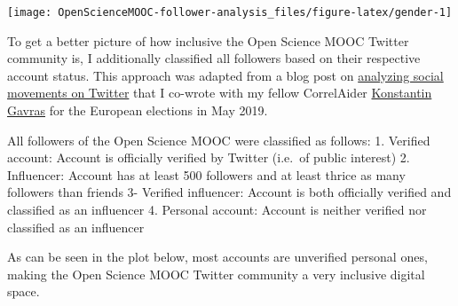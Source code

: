 \documentclass[]{article}
\begin{document}
\begin{center}\texttt{[image: OpenScienceMOOC-follower-analysis\_files/figure-latex/gender-1]} \end{center}

To get a better picture of how inclusive the Open Science MOOC Twitter
community is, I additionally classified all followers based on their
respective account status. This approach was adapted from a blog post on
\href{https://correlaid.org/blog/we2-twitter-analysis/}{analyzing social
movements on Twitter} that I co-wrote with my fellow CorrelAider
\href{http://konstantin.gavras.de/}{Konstantin Gavras} for the European
elections in May 2019.

All followers of the Open Science MOOC were classified as follows: 1.
Verified account: Account is officially verified by Twitter (i.e.~of
public interest) 2. Influencer: Account has at least 500 followers and
at least thrice as many followers than friends 3- Verified influencer:
Account is both officially verified and classified as an influencer 4.
Personal account: Account is neither verified nor classified as an
influencer

As can be seen in the plot below, most accounts are unverified personal
ones, making the Open Science MOOC Twitter community a very inclusive
digital space.
\end{document}
